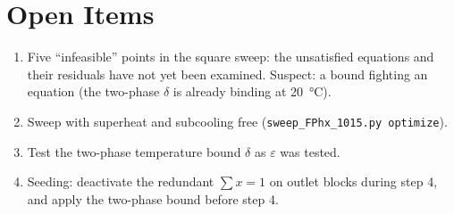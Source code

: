 \documentclass{article}
\begin{document}
\section{Open Items}
\begin{enumerate}
\item Five ``infeasible'' points in the square sweep: the unsatisfied
equations and their residuals have not yet been examined. Suspect: a bound
fighting an equation (the two-phase $\delta$ is already binding at
\SI{20}{\celsius}).
\item Sweep with superheat and subcooling free (\texttt{sweep\_FPhx\_1015.py optimize}).
\item Test the two-phase temperature bound $\delta$ as $\varepsilon$ was tested.
\item Seeding: deactivate the redundant $\sum x=1$ on outlet blocks during
step 4, and apply the two-phase bound before step 4.
\end{enumerate}
\end{document}
